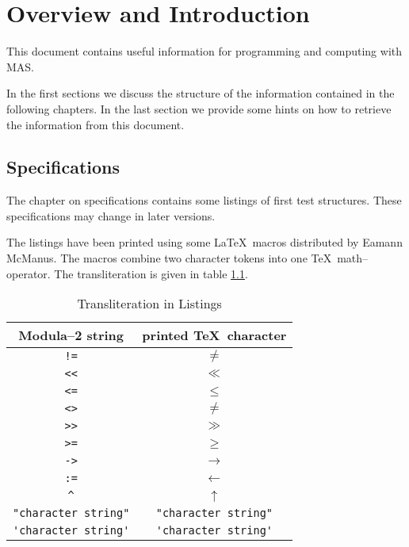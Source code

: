 
\chapter{Overview and Introduction} 

This document contains useful information 
for programming and computing with MAS.

In the first sections we discuss the 
structure of the information contained in the 
following chapters. 
In the last section we provide some hints 
on how to retrieve the information from this 
document.


\section{Specifications}

The chapter on specifications contains
some listings of first test structures.
These specifications may change in later 
versions.

The listings have been printed using 
some \LaTeX\ macros distributed by 
Eamann McManus. The macros combine two 
character tokens into one \TeX\ math--operator.
The transliteration is given in table \ref{tabTL}.

\begin{table}
\begin{center}
\begin{tabular}{|c|c|}
\hline
Modula--2 string & printed \TeX\ character \\
\hline
\verb/!=/  &  $\ne$ \\
\verb/<</  &  $\ll$ \\
\verb/<=/  &  $\le$ \\
\verb/<>/  &  $\ne$ \\
\verb/>>/  &  $\gg$ \\
\verb/>=/  &  $\ge$ \\
\verb/->/  &  $\rightarrow$ \\
\verb/:=/  &  $\leftarrow$ \\
\verb/^/   &  $\uparrow$ \\
\verb/"character string"/  &  \verb*/"character string"/ \\
\verb/'character string'/  &  \verb*/'character string'/ \\
\hline
\end{tabular}
\end{center}
\label{tabTL}
\caption{Transliteration in Listings}
\end{table}


